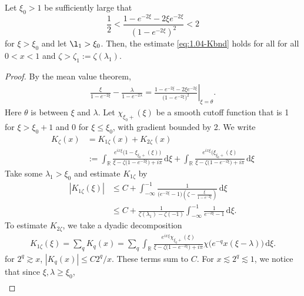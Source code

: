 \documentclass[../dissertation.tex]{subfiles}
\begin{document}
\begin{lma}%
	\label{lma:1.04-largez}
	Let $\xi_0 > 1$ be suf{}ficiently large that
	\[
		\frac{1}{2} 
			< \frac{1-e^{-2\xi}-2 \xi e^{-2\xi}}{\left(1-e^{-2\xi}\right)^2} 
			< 2
	\]
	for $\xi > \xi_0$ and let $\l_1 > \xi_0$. Then, the estimate
	\eqref{eq:1.04-Kbnd} holds for all for all $0 < x < 1$ and 
	$\zeta > \zeta_1 := \zeta(\lambda_1)$.
\end{lma}
\begin{proof}
	By the mean value theorem,
	\begin{align}\label{eq:1.04-14}
		\frac{\xi}{1-e^{-2\xi}} - \frac{\lambda}{1-e^{-2\lambda}}
			= \left. 
					\frac{1- e^{-2\xi} - 2 \xi e^{-2\xi}}{\big(1-e^{-2\xi}\big)^2}
				\right|_{\xi = \theta}.
	\end{align}
	Here $\theta$ is between $\xi$ and $\lambda$. Let $\chi_{\xi_0+}(\xi)$ be a smooth
	cutof{}f function that is 1 for $\xi > \xi_0 +1$ and 0 for $\xi \leq \xi_0$, with 
	gradient bounded by 2. We write
	\begin{align*}
		K_{\zeta}(x)
			&= K_{1\zeta}(x) + K_{2\zeta}(x) \\
			&:= \int_{\mathbb R}
					\frac{e^{ix\xi}\big(1 - \xi_{\xi_0+}(\xi) \big)}
						{\xi - \zeta\big( 1 - e^{-2\xi} \big) + i\pi}
				\, \mathrm{d}\xi
				+
				\int_{\mathbb R}
					\frac{e^{ix\xi}\big(\xi_{\xi_0+}(\xi)}
						{\xi - \zeta\big( 1 - e^{-2\xi} \big) + i\pi}
				\, \mathrm{d}\xi
	\end{align*}
	Take some $\lambda_1 > \xi_0$ and estimate $K_{1\zeta}$ by 
	\begin{align*}
		|K_{1\zeta}(\xi)|
			&\leq C + 
				\int_{-\infty}^{-1} 
					\frac{1}{\big(e^{-2\xi}-1\big)\left(\zeta-\frac{\xi}{1-e^{-2\xi}}\right)}
				\, \mathrm{d}\xi \\
			&\leq C + 
				\frac{1}{\zeta(\lambda_1) - \zeta(-1)}
				\int_{-\infty}^{-1} 
					\frac{1}{e^{-2\xi}-1}
				\, \mathrm{d}\xi.
	\end{align*}
	To estimate $K_{2\zeta}$, we take a dyadic decomposition
	\begin{align*}
		K_{1\zeta}(\xi)
			= \sum_q K_q(x) 
			= \sum_q 
				\int_{\mathbb R}
					\frac{e^{ix\xi}\chi_{\xi_0+}(\xi)}
						{\xi -\zeta\big(1-e^{-2\xi}\big)+i\pi}
					\chi\big(e^{-q} x (\xi - \lambda)\big)
				\, \mathrm{d}\xi.
	\end{align*}
	for $2^q \gtrsim x$, $|K_q(x)| \leq C2^q/x$. These terms sum to $C$. For 
	$x \lesssim 2^q \lesssim 1$, we notice that since $\xi, \lambda \geq \xi_0$,
	\begin{align*}

\end{align*}
\end{proof}
\end{document}
